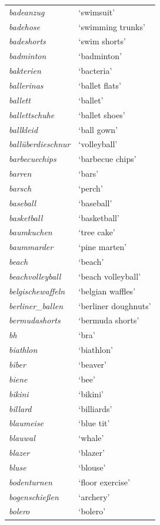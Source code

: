 \begin{longtable}{ll}
\textit{badeanzug} & `swimsuit' \\
\textit{badehose} & `swimming trunks' \\
\textit{badeshorts} & `swim shorts' \\
\textit{badminton} & `badminton' \\
\textit{bakterien} & `bacteria' \\
\textit{ballerinas} & `ballet flats' \\
\textit{ballett} & `ballet' \\
\textit{ballettschuhe} & `ballet shoes' \\
\textit{ballkleid} & `ball gown' \\
\textit{ballüberdieschnur} & `volleyball' \\
\textit{barbecuechips} & `barbecue chips' \\
\textit{barren} & `bars' \\
\textit{barsch} & `perch' \\
\textit{baseball} & `baseball' \\
\textit{basketball} & `basketball' \\
\textit{baumkuchen} & `tree cake' \\
\textit{baummarder} & `pine marten' \\
\textit{beach} & `beach' \\
\textit{beachvolleyball} & `beach volleyball' \\
\textit{belgischewaffeln} & `belgian waffles' \\
\textit{berliner\_ballen} & `berliner doughnuts' \\
\textit{bermudashorts} & `bermuda shorts' \\
\textit{bh} & `bra' \\
\textit{biathlon} & `biathlon' \\
\textit{biber} & `beaver' \\
\textit{biene} & `bee' \\
\textit{bikini} & `bikini' \\
\textit{billard} & `billiards' \\
\textit{blaumeise} & `blue tit' \\
\textit{blauwal} & `whale' \\
\textit{blazer} & `blazer' \\
\textit{bluse} & `blouse' \\
\textit{bodenturnen} & `floor exercise' \\
\textit{bogenschießen} & `archery' \\
\textit{bolero} & `bolero' \\

\end{longtable}

